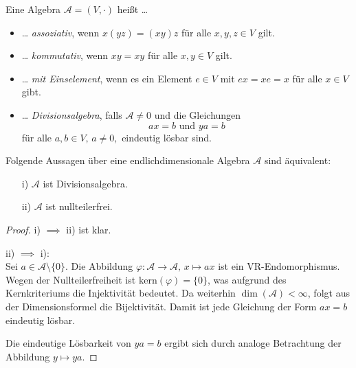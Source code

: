 \documentclass[aspectratio=169]{beamer}
\begin{document}
    \begin{frame}
        \begin{definition}
            Eine Algebra \(\mathcal{A} = (V, \cdot)\) heißt \dots
            \begin{itemize}
                \item
                    \dots{} \textit{assoziativ}, wenn \(x(yz) = (xy)z\) für alle \(x, y, z \in V\) gilt.
                \item
                    \dots{} \textit{kommutativ}, wenn \(xy = xy\) für alle \(x, y \in V\) gilt.
                \item
                    \dots{} \textit{mit Einselement}, wenn es ein Element \(e \in V\) mit \(ex = xe = x\) für alle \(x \in V\) gibt.

                \item
                    \dots{} \textit{Divisionsalgebra}, falls \(\mathcal{A} \neq 0\) und die Gleichungen
                    \[
                        ax = b \text{ und } ya = b
                    \]
                    für alle \(a, b \in V, \, a \neq 0,\) eindeutig lösbar sind.
            \end{itemize}
        \end{definition}
    \end{frame}

    \begin{frame}
        \begin{lemma}
            Folgende Aussagen über eine endlichdimensionale Algebra \(\mathcal{A}\) sind äquivalent:
            \begin{itemize}
                \item[i)]
                    \(\mathcal{A}\) ist Divisionsalgebra.

                \item[ii)]
                    \(\mathcal{A}\) ist nullteilerfrei.
            \end{itemize}
        \end{lemma}
    \end{frame}

    \begin{frame}
        \begin{proof}
            i) \(\implies\) ii) ist klar.

            ii) \(\implies\) i): \\
            Sei \(a \in \mathcal{A} \setminus \{0\}\).
            Die Abbildung \(\varphi \colon \mathcal{A} \to \mathcal{A},\, x \mapsto ax\) ist ein VR-Endomorphismus.
            Wegen der Nullteilerfreiheit ist \(\text{kern}(\varphi) = \{0\}\), was aufgrund des Kernkriteriums die Injektivität bedeutet.
            Da weiterhin \(\dim(\mathcal{A}) < \infty\), folgt aus der Dimensionsformel die Bijektivität.
            Damit ist jede Gleichung der Form \(ax = b\) eindeutig lösbar.

            Die eindeutige Lösbarkeit von \(ya = b\) ergibt sich durch analoge Betrachtung der Abbildung \(y \mapsto ya\).
        \end{proof}
    \end{frame}
\end{document}
